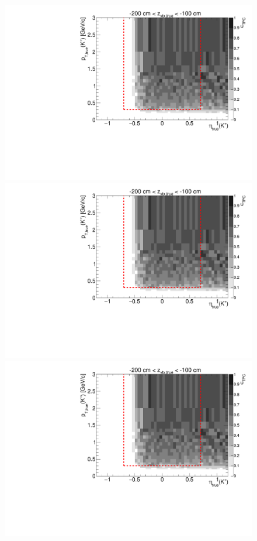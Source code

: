 \begin{figure}[hb]\ContinuedFloat
\centering
\parbox{0.495\textwidth}{
  \centering
  \includegraphics[width=\linewidth,page=11]{graphics/eff/Eff2D_TPC_kaon_Plus.pdf}\\
  \includegraphics[width=\linewidth,page=13]{graphics/eff/Eff2D_TPC_kaon_Plus.pdf}\\
  \includegraphics[width=\linewidth,page=15]{graphics/eff/Eff2D_TPC_kaon_Plus.pdf}\\
}
\end{figure}
